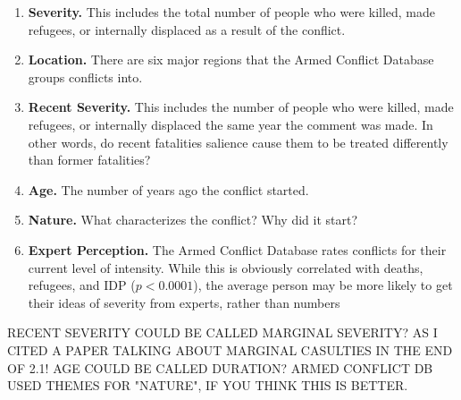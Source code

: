 \begin{enumerate}
\item{\textbf{Severity.} This includes the total number of people who were killed, made refugees, or internally displaced as a result of the conflict.} 
\item {\textbf{Location.} There are six major regions that the Armed Conflict Database groups conflicts into.} 
\item {\textbf{Recent Severity.} This includes the number of people who were killed, made refugees, or internally displaced the same year the comment was made. In other words, do recent fatalities salience cause them to be treated differently than former fatalities?}
\item {\textbf{Age.} The number of years ago the conflict started.}
\item {\textbf{Nature.} What characterizes the conflict? Why did it start?}
\item {\textbf{Expert Perception.} The Armed Conflict Database rates conflicts for their current level of intensity. While this is obviously correlated with deaths, refugees, and IDP ($p < 0.0001$), the average person may be more likely to get their ideas of severity from experts, rather than numbers} 
\end{enumerate}

RECENT SEVERITY COULD BE CALLED MARGINAL SEVERITY? AS I CITED A PAPER TALKING ABOUT MARGINAL CASULTIES IN THE END OF 2.1!
AGE COULD BE CALLED DURATION? ARMED CONFLICT DB USED THEMES FOR "NATURE", IF YOU THINK THIS IS BETTER.

